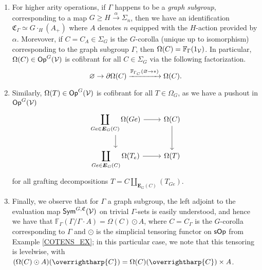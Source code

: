 \documentclass[a4paper,10pt
,draft
]{article}%
\renewcommand{\1}{\eta}%
\newcommand{\vect}[1]{\text{\overrightharp{\ensuremath{#1}}}}
\begin{document}
\begin{example}
\begin{enumerate}[label = (\roman*)]
      \item For higher arity operations,
            if $\Gamma$ happens to be a \textit{graph subgroup}, corresponding to a map $G \geq H \xrightarrow{\alpha} \Sigma_n$, then
            we have an identification $\mathfrak C_{\Gamma} \simeq G \cdot_H (A_+)$ where $A$ denotes $n$ equipped with the $H$-action provided by $\alpha$.
            Morevover, if $C = C_A \in \Sigma_G$ is the $G$-corolla (unique up to isomorphism) corresponding to the graph subgroup $\Gamma$, then
            $\Omega(C) = \mathbb F_{\Gamma}(1_{\mathcal V})$.
            In particular, $\Omega(C) \in \mathsf{Op}^G(\mathcal V)$ is cofibrant for all $C \in \Sigma_G$ via the following factorization.
            \[
                  \varnothing \to \partial\Omega(C) \xrightarrow{\mathbb F_{\Gamma_C}(\varnothing \to \**)} \Omega(C).
            \]
      \item Similarly, $\Omega(T) \in \mathsf{Op}^G(\mathcal V)$ is cofibrant for all $T \in \Omega_G$, as we have a pushout in $\mathsf{Op}^G(\mathcal V)$
            \[
                  \begin{tikzcd}
                        \displaystyle{
                          \coprod_{Ge \in \boldsymbol{E}_G(C)} \Omega(Ge)}
                        \arrow[r] \arrow[d]
                        &
                        \Omega(C) \arrow[d]
                        \\
                        \displaystyle{
                          \coprod_{Ge \in \boldsymbol{E}_G(C)} \Omega(T_e)}
                        \arrow[r]
                        &
                        \Omega(T)
                  \end{tikzcd}
            \]
            for all grafting decompositions $T = C \coprod_{\boldsymbol{E}_G(C)} (T_{Ge})$.
      \item Finally, we observe that for $\Gamma$ a graph subgroup,
            the left adjoint to the evaluation map $\mathsf{Sym}^{G, \mathfrak C}(\mathcal V)$ on trivial $\Gamma$-sets is easily understood,
            and hence we have that
            $\mathbb F_\Gamma(\Gamma/\Gamma \cdot A) = \Omega(C) \odot A$,
            where $C = C_\Gamma$ is the $G$-corolla corresponding to $\Gamma$
            and $\odot$ is the simplicial tensoring functor on $\mathsf{sOp}$ from Example \ref{COTENS_EX};
            in this particular case, we note that this tensoring is levelwise, with $(\Omega(C) \odot A)(\vect C) = \Omega(C)(\vect C) \times A$.
      \end{enumerate}
\end{example}
\end{document}
